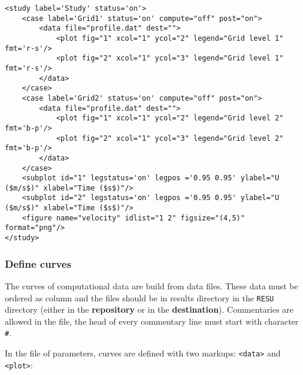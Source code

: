 \documentclass[a4paper,10pt,twoside]{csshortdoc}
\begin{document}
\small
\begin{verbatim}
<study label='Study' status='on'>
    <case label='Grid1' status='on' compute="off" post="on">
        <data file="profile.dat" dest="">
            <plot fig="1" xcol="1" ycol="2" legend="Grid level 1" fmt='r-s'/>
            <plot fig="2" xcol="1" ycol="3" legend="Grid level 1" fmt='r-s'/>
        </data>
    </case>
    <case label='Grid2' status='on' compute="off" post="on">
        <data file="profile.dat" dest="">
            <plot fig="1" xcol="1" ycol="2" legend="Grid level 2" fmt='b-p'/>
            <plot fig="2" xcol="1" ycol="3" legend="Grid level 2" fmt='b-p'/>
        </data>
    </case>
    <subplot id="1" legstatus='on' legpos ='0.95 0.95' ylabel="U ($m/s$)" xlabel="Time ($s$)"/>
    <subplot id="2" legstatus='on' legpos ='0.95 0.95' ylabel="U ($m/s$)" xlabel="Time ($s$)"/>
    <figure name="velocity" idlist="1 2" figsize="(4,5)" format="png"/>
</study>
\end{verbatim}
\normalsize

\subsubsection{Define curves}

The curves of computational data are build from data files. These data must be
ordered as column and the files should be in results directory in the
\texttt{RESU} directory (either in the \textbf{repository} or in the
\textbf{destination}). Commentaries are allowed in the file, the head of every
commentary line must start with character \texttt{\#}.

In the file of parameters, curves are defined with two markups:
\texttt{<data>} and \texttt{<plot>}:
\end{document}
